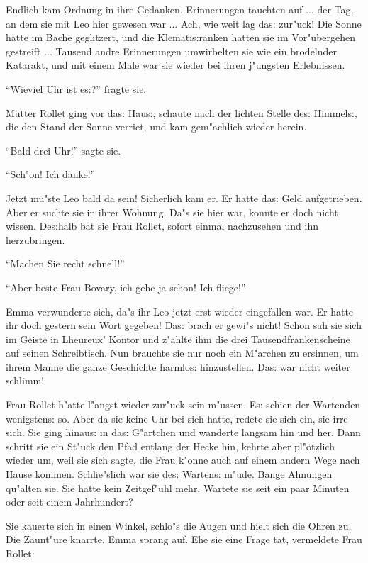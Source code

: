 \documentclass[oneside,12pt]{book}
\newcommand{\s}{s:}%
\begin{document}
Endlich kam Ordnung in ihre Gedanken. Erinnerungen tauchten auf
... der Tag, an dem sie mit Leo hier gewesen war ... Ach, wie weit
lag da{\s} zur"uck! Die Sonne hatte im Bache geglitzert, und die
Klemati{\s}ranken hatten sie im Vor"ubergehen gestreift ...
Tausend andre Erinnerungen umwirbelten sie wie ein brodelnder
Katarakt, und mit einem Male war sie wieder bei ihren j"ungsten
Erlebnissen.

"`Wieviel Uhr ist e{\s}?"' fragte sie.

Mutter Rollet ging vor da{\s} Hau{\s}, schaute nach der lichten
Stelle de{\s} Himmel{\s}, die den Stand der Sonne verriet, und kam
gem"achlich wieder herein.

"`Bald drei Uhr!"' sagte sie.

"`Sch"on! Ich danke!"'

Jetzt mu"ste Leo bald da sein! Sicherlich kam er. Er hatte da{\s}
Geld aufgetrieben. Aber er suchte sie in ihrer Wohnung. Da"s sie
hier war, konnte er doch nicht wissen. De{\s}halb bat sie Frau
Rollet, sofort einmal nachzusehen und ihn herzubringen.

"`Machen Sie recht schnell!"'

"`Aber beste Frau Bovary, ich gehe ja schon! Ich fliege!"'

Emma verwunderte sich, da"s ihr Leo jetzt erst wieder eingefallen
war. Er hatte ihr doch gestern sein Wort gegeben! Da{\s} brach er
gewi"s nicht! Schon sah sie sich im Geiste in Lheureux' Kontor und
z"ahlte ihm die drei Tausendfrankenscheine auf seinen
Schreibtisch. Nun brauchte sie nur noch ein M"archen zu ersinnen,
um ihrem Manne die ganze Geschichte harmlo{\s} hinzustellen.
Da{\s} war nicht weiter schlimm!

Frau Rollet h"atte l"angst wieder zur"uck sein m"ussen. E{\s}
schien der Wartenden wenigsten{\s} so. Aber da sie keine Uhr bei
sich hatte, redete sie sich ein, sie irre sich. Sie ging hinau{\s}
in da{\s} G"artchen und wanderte langsam hin und her. Dann schritt
sie ein St"uck den Pfad entlang der Hecke hin, kehrte aber
pl"otzlich wieder um, weil sie sich sagte, die Frau k"onne auch
auf einem andern Wege nach Hause kommen. Schlie"slich war sie
de{\s} Warten{\s} m"ude. Bange Ahnungen qu"alten sie. Sie hatte
kein Zeitgef"uhl mehr. Wartete sie seit ein paar Minuten oder seit
einem Jahrhundert?

Sie kauerte sich in einen Winkel, schlo"s die Augen und hielt sich
die Ohren zu. Die Zaunt"ure knarrte. Emma sprang auf. Ehe sie eine
Frage tat, vermeldete Frau Rollet:
\end{document}
